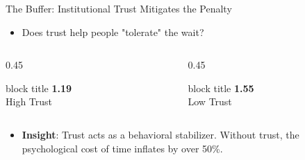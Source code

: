 \documentclass[10pt]{beamer}
\begin{document}
\begin{frame}{The Buffer: Institutional Trust Mitigates the Penalty}
    \begin{itemize}
        \item Does trust help people "tolerate" the wait?
    \end{itemize}
    \vspace{0.4cm}
    \begin{columns}[T]
        \begin{column}{0.45\textwidth}
            \begin{beamercolorbox}[sep=0.8em, wd=\linewidth, center]{block title}
                \Large \textbf{1.19} \\ \small High Trust
            \end{beamercolorbox}
        \end{column}
        \begin{column}{0.45\textwidth}
            \begin{beamercolorbox}[sep=0.8em, wd=\linewidth, center]{block title}
                \Large \alert{\textbf{1.55}} \\ \small Low Trust
            \end{beamercolorbox}
        \end{column}
    \end{columns}
    \vfill
    \begin{itemize}
        \item \textbf{Insight}: Trust acts as a \alert{behavioral stabilizer}. Without trust, the psychological cost of time inflates by over 50\%.
    \end{itemize}
\end{frame}

\end{document}
